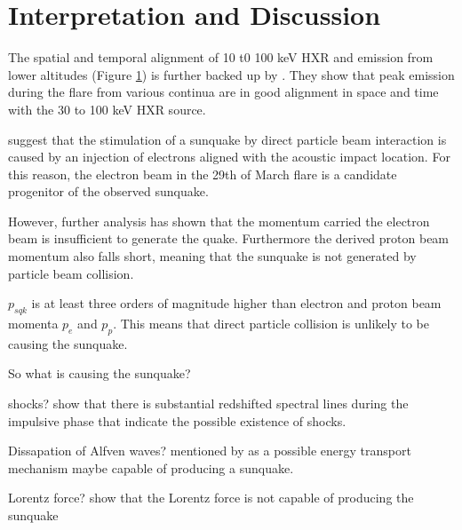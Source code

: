 \section{Interpretation and Discussion}

The spatial and temporal alignment of 10 t0 100 keV HXR and emission from lower altitudes (Figure \ref{}) is further backed up by \cite{2016ApJ...816...88K}. They show that peak emission during the flare from various continua are in good alignment in space and time with the 30 to 100 keV HXR source.  

\cite{1998Natur.393..317K} suggest that the stimulation of a sunquake by direct particle beam interaction is caused by an injection of electrons aligned with the acoustic impact location. For this reason, the electron beam in the 29th of March flare is a candidate progenitor of the observed sunquake. 

However, further analysis has shown that the momentum carried the electron beam is insufficient to generate the quake. Furthermore the derived proton beam momentum also falls short, meaning that the sunquake is not generated by particle beam collision.    



$p_{sqk}$ is at least three orders of magnitude higher than electron and proton beam momenta $p_e$ and $p_p$. This means that direct particle collision is unlikely to be causing the sunquake. 






So what is causing the sunquake?

shocks? 
\cite{2015ApJ...812...35M} show that there is substantial redshifted spectral lines during the impulsive phase that indicate the possible existence of shocks. 


Dissapation of Alfven waves?
\cite{1982SoPh...80...99E} mentioned by \cite{2015ApJ...812...35M} as a possible energy transport mechanism maybe capable of producing a sunquake.

Lorentz force?
\cite{2014ApJ...796...85J} show that the Lorentz force is not capable of producing the sunquake  

